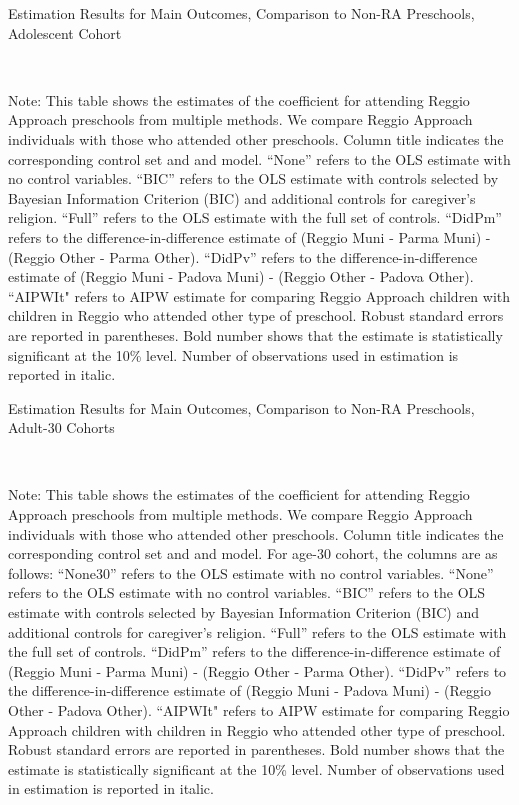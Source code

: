 \begin{table}[H] \caption{Estimation Results for Main Outcomes, Comparison to Non-RA Preschools, Adolescent Cohort} \label{ols-M-adol-reg-pres}
\scalebox{0.7}{}
\vspace{1ex} \\
\footnotesize\raggedright{Note: This table shows the estimates of the coefficient for attending Reggio Approach preschools from multiple methods. We compare Reggio Approach  individuals with those who attended other preschools. Column title indicates the corresponding control set and and model. ``None'' refers to the OLS estimate with no control variables. ``BIC'' refers to the OLS estimate with controls selected by Bayesian Information Criterion (BIC) and additional controls for caregiver's religion. ``Full'' refers to the OLS estimate with the full set of controls. ``DidPm'' refers to the difference-in-difference estimate of (Reggio Muni - Parma Muni) - (Reggio Other - Parma Other). ``DidPv'' refers to the difference-in-difference estimate of (Reggio Muni - Padova Muni) - (Reggio Other - Padova Other). ``AIPWIt" refers to AIPW estimate for comparing Reggio Approach children with children in Reggio who attended other type of preschool. Robust standard errors are reported in parentheses. Bold number shows that the estimate is statistically significant at the 10\% level. Number of observations used in estimation is reported in italic.}
\end{table}




\begin{table}[H] \caption{Estimation Results for Main Outcomes, Comparison to Non-RA Preschools, Adult-30 Cohorts} \label{ols-M-adult30-reg-pres}
\scalebox{0.65}{}
\vspace{1ex} \\
\footnotesize\raggedright{Note: This table shows the estimates of the coefficient for attending Reggio Approach preschools from multiple methods. We compare Reggio Approach  individuals with those who attended other preschools.  Column title indicates the corresponding control set and and model. For age-30 cohort, the columns are as follows: ``None30'' refers to the OLS estimate with no control variables. ``None'' refers to the OLS estimate with no control variables. ``BIC'' refers to the OLS estimate with controls selected by Bayesian Information Criterion (BIC) and additional controls for caregiver's religion. ``Full'' refers to the OLS estimate with the full set of controls. ``DidPm'' refers to the difference-in-difference estimate of (Reggio Muni - Parma Muni) - (Reggio Other - Parma Other). ``DidPv'' refers to the difference-in-difference estimate of (Reggio Muni - Padova Muni) - (Reggio Other - Padova Other). ``AIPWIt" refers to AIPW estimate for comparing Reggio Approach children with children in Reggio who attended other type of preschool. Robust standard errors are reported in parentheses. Bold number shows that the estimate is statistically significant at the 10\% level. Number of observations used in estimation is reported in italic.}
\end{table}

